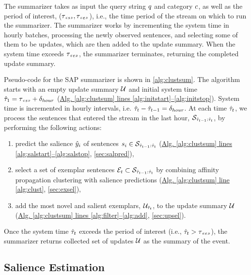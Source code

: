 

The summarizer takes as input the query string $q$ and category
$c$, as well as the period of interest, ($\tau_{\textit{<<s>>}}, \tau_{\textit{<<e>>}}$), i.e.,
the time period of the stream on which to run the summarizer. The summarizer
works by incrementing the system time in hourly batches, processing the newly
observed sentences, and selecting some of them to be updates, which are then
added to the update summary. When the system time exceeds $\tau_{\textit{<<e>>}}$, the
summarizer terminates, returning the completed update summary.

Pseudo-code for the SAP summarizer is shown in \autoref{alg:clustsum}.  The
algorithm starts with an empty update summary $\mathcal{U}$ and initial
system time $\hat{\tau}_1 = \tau_{\textit{<<s>>}} + \delta_{hour}$ (\hyperref[alg:clustsum]{Alg.
\ref{alg:clustsum} lines \ref{alg:initstart}--\ref{alg:initstop}}).  System
time is incremented in hourly intervals, i.e. $\hat{\tau}_{t} - \hat{\tau}_{{t-1}} =
\delta_{hour}$.  At each time $\hat{\tau}_t$, we process the sentences that entered the
stream in the last hour, $\mathcal{S}_{\hat{\tau}_{{t-1}}:\hat{\tau}_t}$, by performing
the following actions:
\begin{enumerate}
    \item predict the salience $\hat{y}_i$ of sentences $s_i \in
\mathcal{S}_{\hat{\tau}_{{t-1}}:\hat{\tau}_t}$
(\hyperref[alg:clustsum]{Alg. \ref{alg:clustsum} lines
\ref{alg:salstart}--\ref{alg:salstop}}, \autoref{sec:salpred}),
    \item select a set of exemplar sentences $\mathcal{E}_t \subset
\mathcal{S}_{\hat{\tau}_{{t-1}}:\hat{\tau}_t}$ by combining
affinity propagation clustering with salience predictions
(\hyperref[alg:clustsum]{Alg. \ref{alg:clustsum} line \ref{alg:clust}},
\autoref{sec:exsel}),
    \item add the most novel and salient exemplars,
$\mathcal{U}_{\hat{\tau}_t}$, to the update summary $\mathcal{U}$
(\hyperref[alg:clustsum]{Alg. \ref{alg:clustsum} lines
\ref{alg:filter}--\ref{alg:add}}, \autoref{sec:upsel}).
\end{enumerate}
Once the system time $\hat{\tau}_t$ exceeds the period of interest (i.e., $\hat{\tau}_t
> \tau_{\textit{<<e>>}}$), the summarizer returns collected set of updates $\mathcal{U}$
as the summary of the event.

\subsection{{Salience Estimation}}
\label{sec:salpred}

